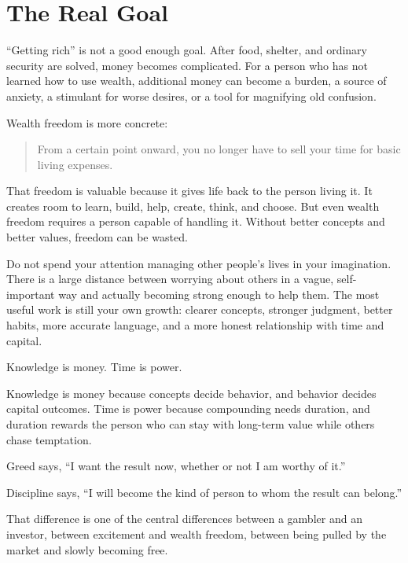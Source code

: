 \section*{The Real Goal}

``Getting rich'' is not a good enough goal. After food, shelter, and ordinary security are solved, money becomes complicated. For a person who has not learned how to use wealth, additional money can become a burden, a source of anxiety, a stimulant for worse desires, or a tool for magnifying old confusion.

Wealth freedom is more concrete:

\begin{quote}
From a certain point onward, you no longer have to sell your time for basic living expenses.
\end{quote}

That freedom is valuable because it gives life back to the person living it. It creates room to learn, build, help, create, think, and choose. But even wealth freedom requires a person capable of handling it. Without better concepts and better values, freedom can be wasted.

Do not spend your attention managing other people's lives in your imagination. There is a large distance between worrying about others in a vague, self-important way and actually becoming strong enough to help them. The most useful work is still your own growth: clearer concepts, stronger judgment, better habits, more accurate language, and a more honest relationship with time and capital.

Knowledge is money. Time is power.

Knowledge is money because concepts decide behavior, and behavior decides capital outcomes. Time is power because compounding needs duration, and duration rewards the person who can stay with long-term value while others chase temptation.

Greed says, ``I want the result now, whether or not I am worthy of it.''

Discipline says, ``I will become the kind of person to whom the result can belong.''

That difference is one of the central differences between a gambler and an investor, between excitement and wealth freedom, between being pulled by the market and slowly becoming free.
